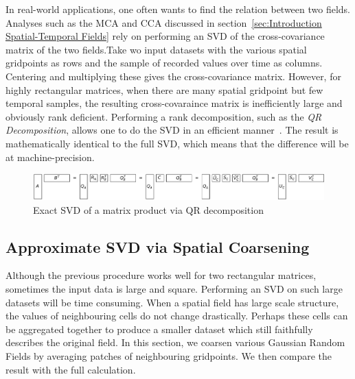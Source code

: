 \documentclass{acm_proc_article-sp}
\begin{document}
In real-world applications, one often wants to find the relation between two fields. Analyses such as the MCA and CCA discussed in section~\ref{sec:Introduction Spatial-Temporal Fields} rely on performing an SVD of the cross-covariance matrix of the two fields.Take wo input datasets with the various spatial gridpoints as rows and the sample of recorded values over time as columns. Centering and multiplying these gives the cross-covariance matrix. However, for highly rectangular matrices, when there are many spatial gridpoint but few temporal samples, the resulting cross-covaraince matrix is inefficiently large and obviously rank deficient. Performing a rank decomposition, such as the \textit{QR Decomposition}, allows one to do the SVD in an efficient manner~\cite{Chan1982, Tygert2017}. The result is mathematically identical to the full SVD, which means that the difference will be at machine-precision.

\begin{figure}[h]
\begin{center}
\includegraphics[width=\columnwidth]{Results/qrProductSVD.pdf}
\caption[Exact SVD via QR decomposition]{Exact SVD of a matrix product via QR decomposition}
\label{fig:qrProductSVD}
\end{center}
\end{figure}
\vspace{-3mm}

\subsection{Approximate SVD via Spatial Coarsening}
\label{sec:Techniques Approximate SVD via Spatial Coarsening}

Although the previous procedure works well for two rectangular matrices, sometimes the input data is large and square. Performing an SVD on such large datasets will be time consuming. When a spatial field has large scale structure, the values of neighbouring cells do not change drastically. Perhaps these cells can be aggregated together to produce a smaller dataset which still faithfully describes the original field. In this section, we coarsen various Gaussian Random Fields by averaging patches of neighbouring gridpoints. We then compare the result with the full calculation.
\end{document}
